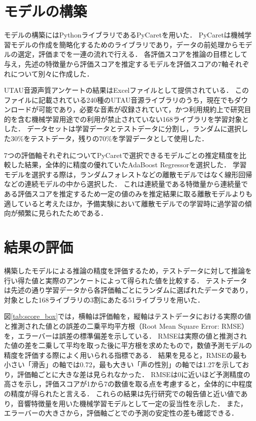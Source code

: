 \section{モデルの構築}
\label{sec:model}

モデルの構築にはPythonライブラリであるPyCaretを用いた．
PyCaretは機械学習モデルの作成を簡略化するためのライブラリであり，データの前処理からモデルの選定，評価までを一連の流れで行える．
各評価スコアを推論の目標として与え，先述の特徴量から評価スコアを推定するモデルを評価スコアの7軸それぞれについて別々に作成した．

UTAU音源声質アンケートの結果はExcelファイルとして提供されている．
このファイルに記載されている240種のUTAU音源ライブラリのうち，現在でもダウンロードが可能であり，必要な音素が収録されていて，かつ利用規約上で研究目的を含む機械学習用途での利用が禁止されていない168ライブラリを学習対象とした．
データセットは学習データとテストデータに分割し，ランダムに選択した30\%をテストデータ，残りの70\%を学習データとして使用した．

7つの評価軸それぞれについてPyCaretで選択できるモデルごとの推定精度を比較した結果，全体的に精度の優れていたAdaBoost Regressorを選択した．
学習モデルを選択する際は，ランダムフォレストなどの離散モデルではなく線形回帰などの連続モデルの中から選択した．
これは連続量である特徴量から連続量である評価スコアを推定するため一定の値のみを推定結果に取る離散モデルよりも適していると考えたほか，予備実験において離散モデルでの学習時に過学習の傾向が頻繁に見られたためである．

\section{結果の評価}
\label{sec:eval}

構築したモデルによる推論の精度を評価するため，テストデータに対して推論を行い得た値と実際のアンケートによって得られた値を比較する．
テストデータは先述の通り学習データから各評価軸ごとにランダムに選ばれたデータであり，対象とした168ライブラリの3割にあたる51ライブラリを用いた．

図\ref{tab:score_box}では，横軸は評価軸を，縦軸はテストデータにおける実際の値と推測された値との誤差の二乗平均平方根（Root Mean Square Error: RMSE）を，エラーバーは誤差の標準偏差を示している．
RMSEは実際の値と推測された値の差を二乗して平均を取った後に平方根を求めたもので，数値予測モデルの精度を評価する際によく用いられる指標である．
結果を見ると，RMSEの最も小さい「滑舌」の軸では0.72，最も大きい「声の性別」の軸では1.27を示しており，評価軸ごとに大きな差は見られなかった．
RMSEは0に近いほど予測精度の高さを示し，評価スコアが1から7の数値を取る点を考慮すると，全体的に中程度の精度が得られたと言える．
これらの結果は先行研究\cite{dnn}での報告値と近い値であり，音響特徴量を用いた機械学習モデルとして一定の妥当性を示した．
また，エラーバーの大きさから，評価軸ごとでの予測の安定性の差も確認できる．

